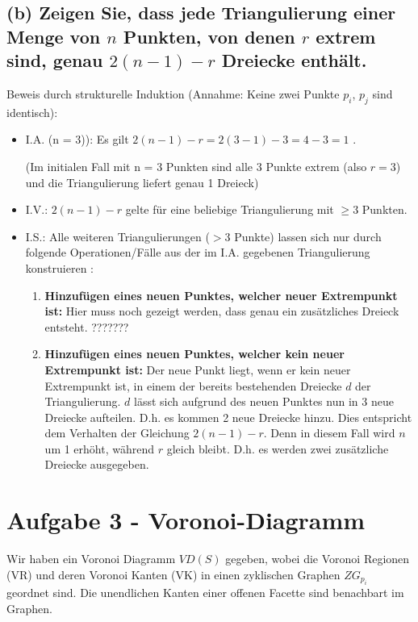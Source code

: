 \documentclass[a4paper]{article}
\begin{document}
\subsection*{(b) Zeigen Sie, dass jede Triangulierung einer Menge von $n$ Punkten, von denen $r$ extrem sind, genau $2 (n - 1) - r$ Dreiecke enthält.}

Beweis durch strukturelle Induktion (Annahme: Keine zwei Punkte $p_i$, $p_j$ sind identisch):

\begin{itemize}
	\item I.A. (n = 3)): Es gilt $2 (n - 1) - r = 2 (3 - 1) - 3 = 4 - 3 = 1$ . \checkmark
	
	(Im initialen Fall mit  n = 3 Punkten sind alle 3 Punkte extrem (also $r = 3$) und die Triangulierung liefert genau 1 Dreieck) 
	\item I.V.: $2 (n - 1) - r$ gelte für eine beliebige Triangulierung mit $\geq 3$ Punkten.
	\item I.S.: Alle weiteren Triangulierungen ($> 3$ Punkte) lassen sich nur durch folgende Operationen/Fälle aus der im I.A. gegebenen Triangulierung konstruieren :
	\begin{enumerate}
		\item \textbf{Hinzufügen eines neuen Punktes, welcher neuer Extrempunkt ist:}
			Hier muss noch gezeigt werden, dass genau ein zusätzliches Dreieck entsteht.
			???????
		\item \textbf{Hinzufügen eines neuen Punktes, welcher kein neuer Extrempunkt ist:}
			Der neue Punkt liegt, wenn er kein neuer Extrempunkt ist, in einem der 
			bereits bestehenden Dreiecke $d$ der Triangulierung. $d$ lässt sich aufgrund
			des neuen Punktes nun in 3 neue Dreiecke aufteilen. D.h. es kommen 2 neue Dreiecke hinzu. Dies entspricht dem Verhalten 	der Gleichung $2 (n - 1) - r$. Denn in diesem Fall wird $n$ um 1 erhöht, während $r$ gleich bleibt. D.h. es werden zwei zusätzliche Dreiecke ausgegeben. \checkmark
	\end{enumerate}
\end{itemize}


\section*{Aufgabe 3 - Voronoi-Diagramm}


Wir haben ein Voronoi Diagramm $VD(S)$ gegeben, wobei die Voronoi Regionen (VR) und deren Voronoi Kanten (VK) in einen zyklischen Graphen $ZG_{p_i}$ geordnet sind. Die unendlichen Kanten einer offenen Facette sind benachbart im Graphen. 
\end{document}
